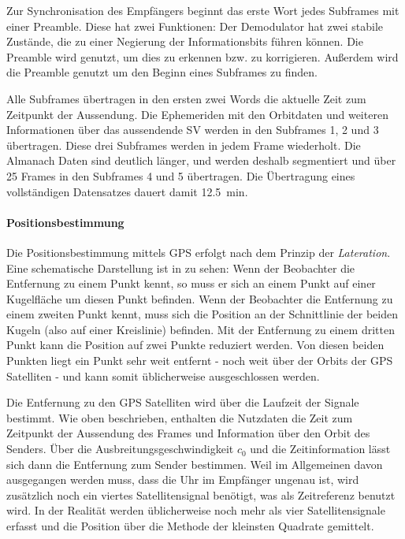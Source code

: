 
Zur Synchronisation des Empfängers beginnt das erste Wort jedes Subframes mit einer Preamble. Diese hat zwei Funktionen: Der Demodulator hat zwei stabile Zustände, die zu einer Negierung der Informationsbits führen können. Die Preamble wird genutzt, um dies zu erkennen bzw. zu korrigieren. Außerdem wird die Preamble genutzt um den Beginn eines Subframes zu finden.

Alle Subframes übertragen in den ersten zwei Words die aktuelle Zeit zum Zeitpunkt der Aussendung. Die Ephemeriden mit den Orbitdaten und weiteren Informationen über das aussendende \gls{SV} werden in den Subframes 1, 2 und 3 übertragen. Diese drei Subframes werden in jedem Frame wiederholt. Die Almanach Daten sind deutlich länger, und werden deshalb segmentiert und über 25 Frames in den Subframes 4 und 5 übertragen. Die Übertragung eines vollständigen Datensatzes dauert damit \SI{12.5}{\minute}.


\paragraph{Positionsbestimmung}
\label{positionsbestimmung}

Die Positionsbestimmung mittels GPS erfolgt nach dem Prinzip der \emph{Lateration}. Eine schematische Darstellung ist in  zu sehen: Wenn der Beobachter die Entfernung zu einem Punkt kennt, so muss er sich an einem Punkt auf einer Kugelfläche um diesen Punkt befinden. Wenn der Beobachter die Entfernung zu einem zweiten Punkt kennt, muss sich die Position an der Schnittlinie der beiden Kugeln (also auf einer Kreislinie) befinden. Mit der Entfernung zu einem dritten Punkt kann die Position auf zwei Punkte reduziert werden. Von diesen beiden Punkten liegt ein Punkt sehr weit entfernt - noch weit über der Orbits der GPS Satelliten - und kann somit üblicherweise ausgeschlossen werden. 

Die Entfernung zu den GPS Satelliten wird über die Laufzeit der Signale bestimmt. Wie oben beschrieben, enthalten die Nutzdaten die Zeit zum Zeitpunkt der Aussendung des Frames und Information über den Orbit des Senders. Über die Ausbreitungsgeschwindigkeit $c_0$ und die Zeitinformation lässt sich dann die Entfernung zum Sender bestimmen. Weil im Allgemeinen davon ausgegangen werden muss, dass die Uhr im Empfänger ungenau ist, wird zusätzlich noch ein viertes Satellitensignal benötigt, was als Zeitreferenz benutzt wird. In der Realität werden üblicherweise noch mehr als vier Satellitensignale erfasst und die Position über die Methode der kleinsten Quadrate gemittelt.

